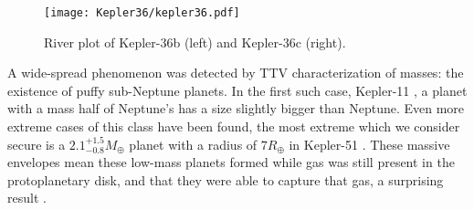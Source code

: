\documentclass[graybox,natbib,nosecnum]{svmult}
\begin{document}
\begin{figure}
\centerline{
\texttt{[image: Kepler36/kepler36.pdf]}}
\caption{River plot of Kepler-36b (left) and Kepler-36c (right).}
\label{fig:kep36}
\end{figure}


A wide-spread phenomenon was detected by TTV characterization of masses: the existence of puffy sub-Neptune planets.  In the first such case, Kepler-11 \citep{2011Natur.470...53L}, a planet with a mass half of Neptune's has a size slightly bigger than Neptune.  Even more extreme cases of this class have been found, the most extreme which we consider secure is a $2.1^{+1.5}_{-0.8} M_\oplus$ planet with a radius of $7 R_\oplus$ in Kepler-51 \citep{2014ApJ...783...53M}.  These massive envelopes mean these low-mass planets formed while gas was still present in the protoplanetary disk, and that they were able to capture that gas, a surprising result \citep[e.g.][]{2016ApJ...817...90L,2016ApJ...825...29G}. 
 
\end{document}
